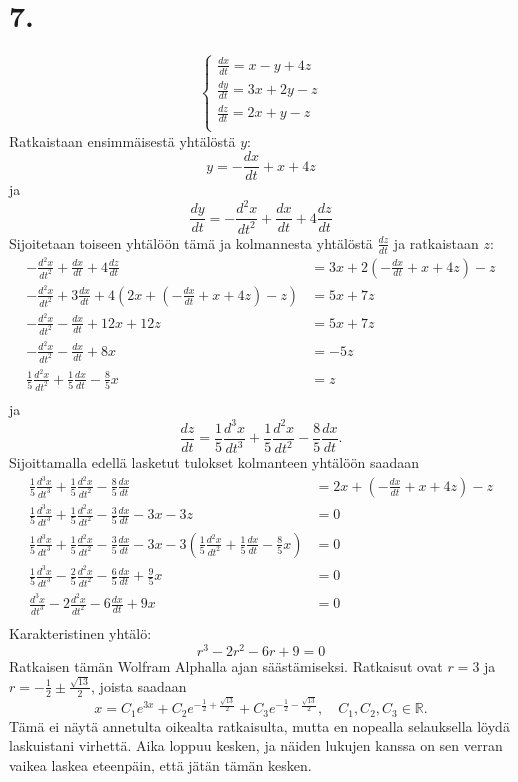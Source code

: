 \documentclass{article}
\begin{document}
\section*{7.}

\[
  \begin{cases}
    \frac{dx}{dt} = x - y + 4z \\
    \frac{dy}{dt} = 3x + 2y - z \\
    \frac{dz}{dt} = 2x + y - z \\
  \end{cases}
\]
Ratkaistaan ensimmäisestä yhtälöstä $y$:
\[
  y = -\frac{dx}{dt} + x + 4z
\]
ja
\[
  \frac{dy}{dt} = -\frac{d^2 x}{d t^2} + \frac{dx}{dt} + 4\frac{dz}{dt}
\]
Sijoitetaan toiseen yhtälöön tämä ja kolmannesta yhtälöstä $\frac{dz}{dt}$ ja
ratkaistaan $z$:
\begin{align*}
  -\frac{d^2 x}{d t^2} + \frac{dx}{dt} + 4\frac{dz}{dt} &= 3x + 2(-\frac{dx}{dt} + x + 4z) - z \\
  -\frac{d^2 x}{d t^2} + 3\frac{dx}{dt} + 4(2x + (-\frac{dx}{dt} + x + 4z) - z) &= 5x + 7z \\
  -\frac{d^2 x}{d t^2} - \frac{dx}{dt} + 12x + 12z &= 5x + 7z \\
  -\frac{d^2 x}{d t^2} - \frac{dx}{dt} + 8x &= -5z \\
  \frac{1}{5}\frac{d^2 x}{d t^2} + \frac{1}{5}\frac{dx}{dt} - \frac{8}{5}x &= z \\
\end{align*}
ja
\[
  \frac{dz}{dt} = \frac{1}{5}\frac{d^3 x}{d t^3} + \frac{1}{5}\frac{d^2 x}{d t^2} - \frac{8}{5}\frac{dx}{dt}.
\]
Sijoittamalla edellä lasketut tulokset kolmanteen yhtälöön saadaan
\begin{align*}
  \frac{1}{5}\frac{d^3 x}{d t^3} + \frac{1}{5}\frac{d^2 x}{d t^2} - \frac{8}{5}\frac{dx}{dt}
  &= 2x + (-\frac{dx}{dt} + x + 4z) - z \\
  \frac{1}{5}\frac{d^3 x}{d t^3} + \frac{1}{5}\frac{d^2 x}{d t^2} - \frac{3}{5}\frac{dx}{dt}
  - 3x - 3z &= 0 \\
  \frac{1}{5}\frac{d^3 x}{d t^3} + \frac{1}{5}\frac{d^2 x}{d t^2} - \frac{3}{5}\frac{dx}{dt}
  - 3x - 3(\frac{1}{5}\frac{d^2 x}{d t^2} + \frac{1}{5}\frac{dx}{dt} - \frac{8}{5}x) &= 0 \\
  \frac{1}{5}\frac{d^3 x}{d t^3} - \frac{2}{5}\frac{d^2 x}{d t^2} - \frac{6}{5}\frac{dx}{dt}
  + \frac{9}{5}x &= 0 \\
  \frac{d^3 x}{d t^3} - 2\frac{d^2 x}{d t^2} - 6\frac{dx}{dt} + 9x &= 0 \\
\end{align*}
Karakteristinen yhtälö:
\[
  r^3 - 2r^2 - 6r + 9 = 0
\]
Ratkaisen tämän Wolfram Alphalla ajan säästämiseksi.
Ratkaisut ovat $r = 3$ ja $r = -\frac{1}{2} \pm \frac{\sqrt{13}}{2}$,
joista saadaan
\[
  x = C_1e^{3x} + C_2e^{-\frac{1}{2} + \frac{\sqrt{13}}{2}} + C_3e^{-\frac{1}{2} - \frac{\sqrt{13}}{2}},
  \quad C_1,C_2,C_3 \in \mathbb{R}.
\]
Tämä ei näytä annetulta oikealta ratkaisulta, mutta en nopealla selauksella
löydä laskuistani virhettä. Aika loppuu kesken, ja näiden lukujen kanssa on sen
verran vaikea laskea eteenpäin, että jätän tämän kesken.
\end{document}
